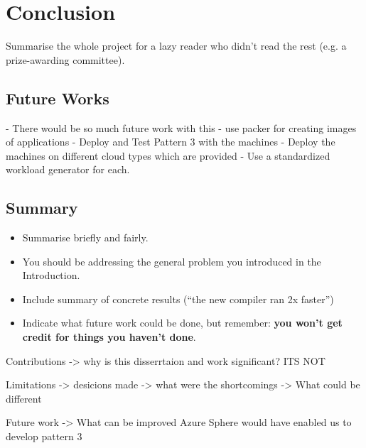 \chapter{Conclusion}    
Summarise the whole project for a lazy reader who didn't read the rest (e.g. a prize-awarding committee).
\section{Future Works}

- There would be so much future work with this 
- use packer for creating images of applications 
- Deploy and Test Pattern 3 with the machines
- Deploy the machines on different cloud types which are provided 
- Use a standardized workload generator for each. 


\section{Summary}
\begin{itemize}
    \item
        Summarise briefly and fairly.
    \item
        You should be addressing the general problem you introduced in the
        Introduction.        
    \item
        Include summary of concrete results (``the new compiler ran 2x
        faster'')
    \item
        Indicate what future work could be done, but remember: \textbf{you
        won't get credit for things you haven't done}.
\end{itemize}


Contributions 
-> why is this disserrtaion and work significant? 
ITS NOT 

Limitations 
-> desicions made 
-> what were the shortcomings 
-> What could be different

Future work 
-> What can be improved 
Azure Sphere would have enabled us to develop pattern 3 


